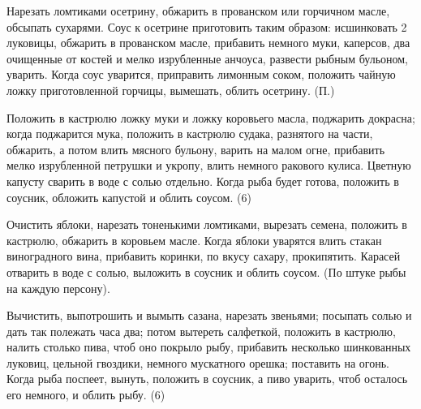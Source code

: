 
Нарезать ломтиками осетрину, обжарить в прованском или горчичном масле, обсыпать сухарями. Соус к осетрине приготовить таким образом: исшинковать 2 луковицы, обжарить в прованском масле, прибавить немного муки, каперсов, два очищенные от костей и мелко изрубленные анчоуса, развести рыбным бульоном, уварить. Когда соус уварится, приправить лимонным соком, положить чайную ложку приготовленной горчицы, вымешать, облить осетрину. (П.) 


Положить в кастрюлю ложку муки и ложку коровьего масла, поджарить докрасна; когда поджарится мука, положить в кастрюлю судака, разнятого на части, обжарить, а потом влить мясного бульону, варить на малом огне, прибавить мелко изрубленной петрушки и укропу, влить немного ракового кулиса. Цветную капусту сварить в воде с солью отдельно. Когда рыба будет готова, положить в соусник, обложить капустой и облить соусом. (6) 


Очистить яблоки, нарезать тоненькими ломтиками, вырезать семена, положить в кастрюлю, обжарить в коровьем масле. Когда яблоки уварятся влить стакан виноградного вина, прибавить коринки, по вкусу сахару, прокипятить. Карасей отварить в воде с солью, выложить в соусник и облить соусом. (По штуке рыбы на каждую персону). 


Вычистить, выпотрошить и вымыть сазана, нарезать звеньями; посыпать солью и дать так полежать часа два; потом вытереть салфеткой, положить в кастрюлю, налить столько пива, чтоб оно покрыло рыбу, прибавить несколько шинкованных луковиц, цельной гвоздики, немного мускатного орешка; поставить на огонь. Когда рыба поспеет, вынуть, положить в соусник, а пиво уварить, чтоб осталось его немного, и облить рыбу. (6) 


